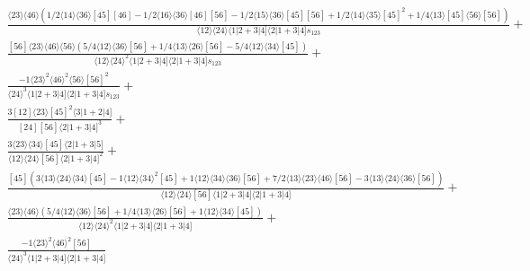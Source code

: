 \documentclass[varwidth, border=5pt]{standalone}
\begin{document}
\begin{my}
$\begin{gathered}
\scriptscriptstyle\frac{⟨23⟩⟨46⟩(1/2⟨14⟩⟨36⟩[45][46]-1/2⟨16⟩⟨36⟩[46][56]-1/2⟨15⟩⟨36⟩[45][56]+1/2⟨14⟩⟨35⟩[45]^2+1/4⟨13⟩[45]⟨56⟩[56])}{⟨12⟩⟨24⟩⟨1|2+3|4]⟨2|1+3|4]s_{123}}+\\
\scriptscriptstyle\frac{[56]⟨23⟩⟨46⟩⟨56⟩(5/4⟨12⟩⟨36⟩[56]+1/4⟨13⟩⟨26⟩[56]-5/4⟨12⟩⟨34⟩[45])}{⟨12⟩⟨24⟩^2⟨1|2+3|4]⟨2|1+3|4]s_{123}}+\\
\scriptscriptstyle\frac{-1⟨23⟩^2⟨46⟩^2⟨56⟩[56]^2}{⟨24⟩^3⟨1|2+3|4]⟨2|1+3|4]s_{123}}+\\
\scriptscriptstyle\frac{3[12]⟨23⟩[45]^2⟨3|1+2|4]}{[24][56]⟨2|1+3|4]^3}+\\
\scriptscriptstyle\frac{3⟨23⟩⟨34⟩[45]⟨2|1+3|5]}{⟨12⟩⟨24⟩[56]⟨2|1+3|4]^2}+\\
\scriptscriptstyle\frac{[45](3⟨13⟩⟨24⟩⟨34⟩[45]-1⟨12⟩⟨34⟩^2[45]+1⟨12⟩⟨34⟩⟨36⟩[56]+7/2⟨13⟩⟨23⟩⟨46⟩[56]-3⟨13⟩⟨24⟩⟨36⟩[56])}{⟨12⟩⟨24⟩[56]⟨1|2+3|4]⟨2|1+3|4]}+\\
\scriptscriptstyle\frac{⟨23⟩⟨46⟩(5/4⟨12⟩⟨36⟩[56]+1/4⟨13⟩⟨26⟩[56]+1⟨12⟩⟨34⟩[45])}{⟨12⟩⟨24⟩^2⟨1|2+3|4]⟨2|1+3|4]}+\\
\scriptscriptstyle\frac{-1⟨23⟩^2⟨46⟩^2[56]}{⟨24⟩^3⟨1|2+3|4]⟨2|1+3|4]}\phantom{+}
\end{gathered}$
\end{my}
\end{document}
